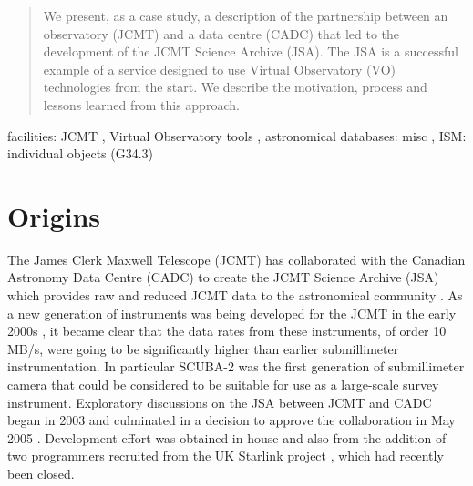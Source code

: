 \documentclass[final,authoryear,5p,times,twocolumn]{elsarticle}
\begin{document}
\begin{frontmatter}
\begin{abstract}

  We present, as a case study, a description of the
  partnership between an observatory (JCMT) and a data centre (CADC)
  that led to the development of the JCMT Science Archive (JSA). The
  JSA is a successful example of a service designed to use Virtual Observatory (VO)
  technologies from the start. We describe the motivation, process and
  lessons learned from this approach.

\end{abstract}

\begin{keyword}


facilities: JCMT \sep
Virtual Observatory tools \sep
astronomical databases: misc \sep
ISM: individual objects (G34.3)

\end{keyword}

\end{frontmatter}


\newcommand{\mnras}{MNRAS}
\newcommand{\aap}{A\&A}
\newcommand{\aaps}{A\&AS}
\newcommand{\pasp}{PASP}
\newcommand{\apj}{ApJ}
\newcommand{\apjs}{ApJS}
\newcommand{\qjras}{QJRAS}
\newcommand{\an}{Astron.\ Nach.}
\newcommand{\ijimw}{Int.\ J.\ Infrared \& Millimeter Waves}
\newcommand{\procspie}{Proc.\ SPIE}
\newcommand{\aspconf}{ASP Conf. Ser.}



\newcommand{\ascl}[1]{\href{http://www.ascl.net/#1}{ascl:#1}}


\section{Origins}

The James Clerk Maxwell Telescope (JCMT) has collaborated with the Canadian Astronomy Data Centre (CADC) to
create the JCMT Science Archive (JSA) which provides raw and reduced JCMT data to the astronomical community
\citep{2008SPIE.7016E..16G,2008ASPC..394..450E,2008ASPC..394..135G,2011ASPC..442..203E}.
As a new generation of instruments was being developed for the JCMT in
the early 2000s \citep[HARP/ACSIS \& SCUBA-2;][]{2000ASPC..217...33D,2003SPIE.4855....1H},
it became clear that
the data rates from these instruments, of order 10\,MB/s, were going to be significantly
higher than earlier submillimeter instrumentation. In
particular SCUBA-2 was the first generation of submillimeter camera
that could be considered to be suitable for use as a large-scale
survey instrument. Exploratory discussions on the JSA between JCMT and CADC
began in 2003 and culminated in a decision to approve the
collaboration in May 2005 \citep{2005JCMTN23}. Development effort was
obtained in-house and also from the addition of two programmers recruited from
the UK Starlink project \citep{1982QJRAS..23..485D}, which had recently been closed.
\end{document}
